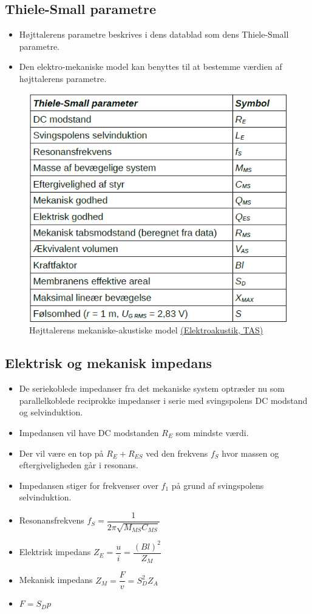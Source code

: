 \subsection{Thiele-Small parametre}
\begin{itemize}
	\item Højttalerens parametre beskrives i dens datablad som dens Thiele-Small parametre.
	\item Den elektro-mekaniske model kan benyttes til at bestemme værdien af højttalerens parametre.
\end{itemize}
\begin{figure} [H]
	\centering
	\includegraphics[width=0.85\linewidth]{graphics/27.png}
	\caption{Højttalerens mekaniske-akustiske model \href{http://www.torean.dk/artikel/Elektroakustik.pdf}{(Elektroakustik, TAS)}}
	\label{fig:27}
\end{figure}

\subsection{Elektrisk og mekanisk impedans}
\begin{itemize}
	\item De seriekoblede impedanser fra det mekaniske system optræder nu som parallelkoblede reciprokke	impedanser i serie med svingspolens DC modstand og selvinduktion. 
	\item Impedansen vil have DC modstanden $R_E$ som mindste værdi. 
	\item Der vil være en top på $R_E + R_{ES}$ ved den frekvens $f_S$ hvor
	massen og eftergiveligheden går i resonans.
	\item Impedansen stiger for frekvenser over $f_1$ på grund af svingspolens selvinduktion. 
	\item Resonansfrekvens $f_S = \dfrac{1}{2\pi\sqrt{M_{MS}C_{MS}}}$
	\item Elektrisk impedans $Z_E = \dfrac{u}{i} = \dfrac{(Bl)^2}{Z_M}$
	\item Mekanisk impedans $Z_M = \dfrac{F}{v}= S_D^2Z_A$
	\item $F= S_D p$
\end{itemize}


